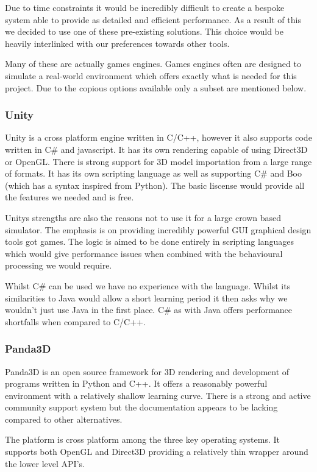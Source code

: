 Due to time constraints it would be incredibly difficult to create
a bespoke system able to provide as detailed and efficient performance.
As a result of this we decided to use one of these pre-existing solutions.
This choice would be heavily interlinked with our preferences towards
other tools.

Many of these are actually games engines. Games engines often are
designed to simulate a real-world environment which offers exactly
what is needed for this project. Due to the copious options available
only a subset are mentioned below.


\subsubsection*{Unity }

Unity is a cross platform engine written in C/C++, however it also
supports code written in C\# and javascript. It has its own rendering
capable of using Direct3D or OpenGL. There is strong support for 3D
model importation from a large range of formats. It has its own scripting
language as well as supporting C\# and Boo (which has a syntax inspired
from Python). The basic liscense would provide all the features we
needed and is free.

Unitys strengths are also the reasons not to use it for a large crown
based simulator. The emphasis is on providing incredibly powerful
GUI graphical design tools got games. The logic is aimed to be done
entirely in scripting languages which would give performance issues
when combined with the behavioural processing we would require.

Whilst C\# can be used we have no experience with the language. Whilst
its similarities to Java would allow a short learning period it then
asks why we wouldn't just use Java in the first place. C\# as with
Java offers performance shortfalls when compared to C/C++.


\subsubsection*{Panda3D}

Panda3D is an open source framework for 3D rendering and development
of programs written in Python and C++. It offers a reasonably powerful
environment with a relatively shallow learning curve. There is a strong
and active community support system but the documentation appears
to be lacking compared to other alternatives.

The platform is cross platform among the three key operating systems.
It supports both OpenGL and Direct3D providing a relatively thin wrapper
around the lower level API's.

